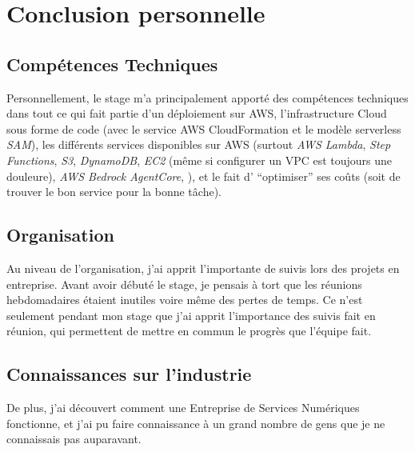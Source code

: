 
\section{Conclusion personnelle}

\subsection*{Compétences Techniques}

\begin{flushleft}
  Personnellement, le stage m'a principalement apporté
  des compétences techniques dans tout ce qui fait partie
  d'un déploiement sur AWS, \sccad{} l'infrastructure Cloud
  sous forme de code (avec le service AWS CloudFormation et
  le modèle serverless \textit{SAM}), les différents services
  disponibles sur AWS (surtout \textit{AWS Lambda},
  \textit{Step Functions}, \textit{S3}, \textit{DynamoDB},
  \textit{EC2} (même si configurer un VPC est toujours une
  douleure), \textit{AWS Bedrock AgentCore}, \scetc), et le fait
  d' ``optimiser'' ses coûts (soit de trouver le bon service
  pour la bonne tâche).
\end{flushleft}

\subsection*{Organisation}

\begin{flushleft}
  Au niveau de l'organisation, j'ai apprit l'importante de suivis
  lors des projets en entreprise. Avant avoir débuté le stage,
  je pensais à tort que les réunions hebdomadaires étaient inutiles
  voire même des pertes de temps. Ce n'est seulement pendant mon stage
  que j'ai apprit l'importance des suivis fait en réunion, qui
  permettent de mettre en commun le progrès que l'équipe fait.
\end{flushleft}

\subsection*{Connaissances sur l'industrie}

\begin{flushleft}
  De plus, j'ai découvert comment une Entreprise de Services
  Numériques fonctionne, et j'ai pu faire connaissance à un
  grand nombre de gens que je ne connaissais pas auparavant.
\end{flushleft}

